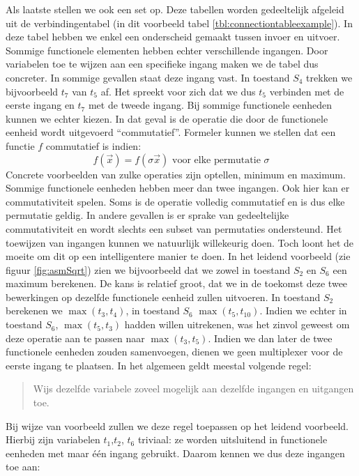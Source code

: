 Als laatste stellen we ook een set  op. Deze tabellen worden gedeeltelijk afgeleid uit de verbindingentabel (in dit voorbeeld tabel \ref{tbl:connectiontableexample}). In deze tabel hebben we enkel een onderscheid gemaakt tussen invoer en uitvoer. Sommige functionele elementen hebben echter verschillende ingangen. Door variabelen toe te wijzen aan een specifieke ingang maken we de tabel dus concreter. In sommige gevallen staat deze ingang vast. In toestand $S_4$ trekken we bijvoorbeeld $t_7$ van $t_5$ af. Het spreekt voor zich dat we dus $t_5$ verbinden met de eerste ingang en $t_7$ met de tweede ingang. Bij sommige functionele eenheden kunnen we echter kiezen. In dat geval is de operatie die door de functionele eenheid wordt uitgevoerd ``commutatief''. Formeler kunnen we stellen dat een functie $f$ commutatief is indien:
\begin{equation}
f\left(\vec{x}\right)=f\left(\sigma\vec{x}\right)\mbox{ voor elke permutatie $\sigma$}
\end{equation}
Concrete voorbeelden van zulke operaties zijn optellen, minimum en maximum. Sommige functionele eenheden hebben meer dan twee ingangen. Ook hier kan er commutativiteit spelen. Soms is de operatie volledig commutatief en is dus elke permutatie geldig. In andere gevallen is er sprake van gedeeltelijke commutativiteit en wordt slechts een subset van permutaties ondersteund. Het toewijzen van ingangen kunnen we natuurlijk willekeurig doen. Toch loont het de moeite om dit op een intelligentere manier te doen. In het leidend voorbeeld (zie figuur \ref{fig:asmSqrt}) zien we bijvoorbeeld dat we zowel in toestand $S_2$ en $S_6$ een maximum berekenen. De kans is relatief groot, dat we in de toekomst deze twee bewerkingen op dezelfde functionele eenheid zullen uitvoeren. In toestand $S_2$ berekenen we $\max\left(t_3,t_4\right)$, in toestand $S_6$ $\max\left(t_5,t_{10}\right)$. Indien we echter in toestand $S_6$, $\max\left(t_5,t_3\right)$ hadden willen uitrekenen, was het zinvol geweest om deze operatie aan te passen
naar $\max\left(t_3,t_5\right)$. Indien we dan later de twee functionele eenheden zouden samenvoegen, dienen we geen multiplexer voor de eerste ingang te plaatsen. In het algemeen geldt meestal volgende regel:
\begin{quote}
Wijs dezelfde variabele zoveel mogelijk aan dezelfde ingangen en uitgangen toe.
\end{quote}
Bij wijze van voorbeeld zullen we deze regel toepassen op het leidend voorbeeld. Hierbij zijn variabelen $t_1$,$t_2$, $t_6$ triviaal: ze worden uitsluitend in functionele eenheden met maar \'e\'en ingang gebruikt. Daarom kennen we dus deze ingangen toe aan:

